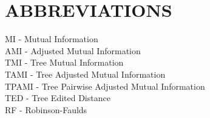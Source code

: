 \clearpage
\chapter*{ABBREVIATIONS}	
				


\noindent MI - Mutual Information \\
AMI - Adjusted Mutual Information \\
TMI - Tree Mutual Information \\
TAMI - Tree Adjusted Mutual Information \\
TPAMI - Tree Pairwise Adjusted Mutual Information\\
TED - Tree Edited Distance \\
RF - Robinson-Faulds \\

\clearpage
\thispagestyle{empty}